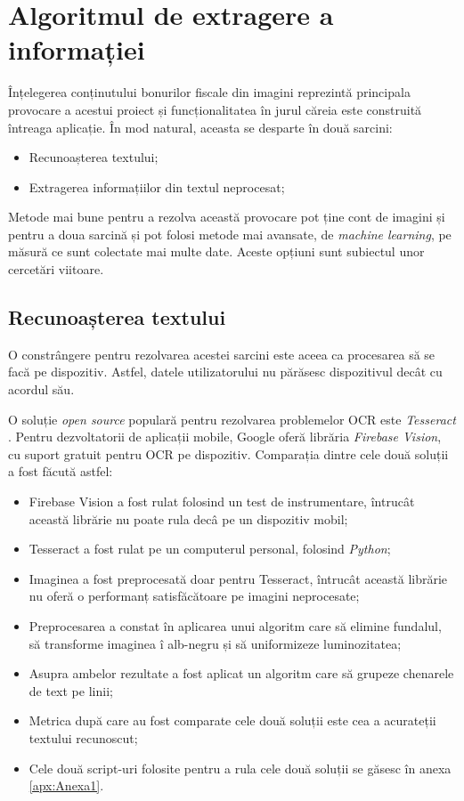 \section{Algoritmul de extragere a informației}

Înțelegerea conținutului bonurilor fiscale din imagini reprezintă principala provocare a acestui proiect și funcționalitatea în jurul căreia este construită întreaga aplicație. În mod natural, aceasta se desparte în două sarcini:

\begin{itemize}
  \item 
  Recunoașterea textului;
  \item
  Extragerea informațiilor din textul neprocesat;
\end{itemize}

Metode mai bune pentru a rezolva această provocare pot ține cont de imagini și pentru a doua sarcină și pot folosi metode mai avansate, de \emph{machine learning}, pe măsură ce sunt colectate mai multe date. Aceste opțiuni sunt subiectul unor cercetări viitoare.

\subsection{Recunoașterea textului}

O constrângere pentru rezolvarea acestei sarcini este aceea ca procesarea să se facă pe dispozitiv. Astfel, datele utilizatorului nu părăsesc dispozitivul decât cu acordul său.

O soluție \emph{open source} populară pentru rezolvarea problemelor OCR este \emph{Tesseract} \cite{Tesseract}. Pentru dezvoltatorii de aplicații mobile, Google oferă librăria \emph{Firebase Vision}, cu suport gratuit pentru OCR pe dispozitiv. Comparația dintre cele două soluții a fost făcută astfel:

\begin{itemize}
  \item 
  Firebase Vision a fost rulat folosind un test de instrumentare, întrucât această librărie nu poate rula decâ pe un dispozitiv mobil;
  \item
  Tesseract a fost rulat pe un computerul personal, folosind \emph{Python};
  \item
  Imaginea a fost preprocesată doar pentru Tesseract, întrucât această librărie nu oferă o performanț satisfăcătoare pe imagini neprocesate;
  \item
  Preprocesarea a constat în aplicarea unui algoritm care să elimine fundalul, să transforme imaginea î alb-negru și să uniformizeze luminozitatea;
  \item
  Asupra ambelor rezultate a fost aplicat un algoritm care să grupeze chenarele de text pe linii;
  \item 
  Metrica după care au fost comparate cele două soluții este cea a acurateții textului recunoscut;
  \item 
  Cele două script-uri folosite pentru a rula cele două soluții se găsesc în anexa \ref{apx:Anexa1}.
\end{itemize}

